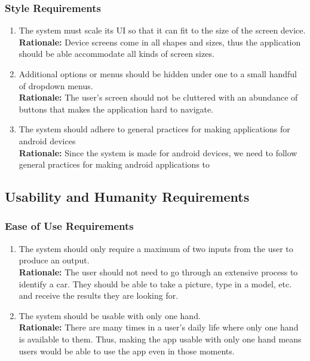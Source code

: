 \documentclass[]{article}
\begin{document}
\subsubsection{Style Requirements}
\label{ssub:style_requirements}
\begin{enumerate}[label={LF-S\arabic*.}]
	\item The system must scale its UI so that it can fit to the size of the screen device.\\
	\textbf{Rationale:} Device screens come in all shapes and sizes, thus the application should be able accommodate all kinds of screen sizes.
	\item Additional options or menus should be hidden under one to a small handful of dropdown menus.\\
	\textbf{Rationale:} The user's screen should not be cluttered with an abundance of buttons that makes the application hard to navigate.
	\item The system should adhere to general practices for making applications for android devices\\
	\textbf{Rationale:} Since the system is made for android devices, we need to follow general practices for making android applications to 

\end{enumerate}


\subsection{Usability and Humanity Requirements}
\label{sub:usability_and_humanity_requirements}

\subsubsection{Ease of Use Requirements}
\label{ssub:ease_of_use_requirements}
\begin{enumerate}[label={UH-EOU\arabic*.}]
	\item The system should only require a maximum of two inputs from the user to produce an output.\\
	\textbf{Rationale:} The user should not need to go through an extensive process to identify a car. They should be able to take a picture, type in a model, etc. and receive the results they are looking for.
	\item The system should be usable with only one hand.\\
	\textbf{Rationale:} There are many times in a user's daily life where only one hand is available to them. Thus, making the app usable with only one hand means users would be able to use the app even in those moments.
\end{enumerate}
\end{document}
